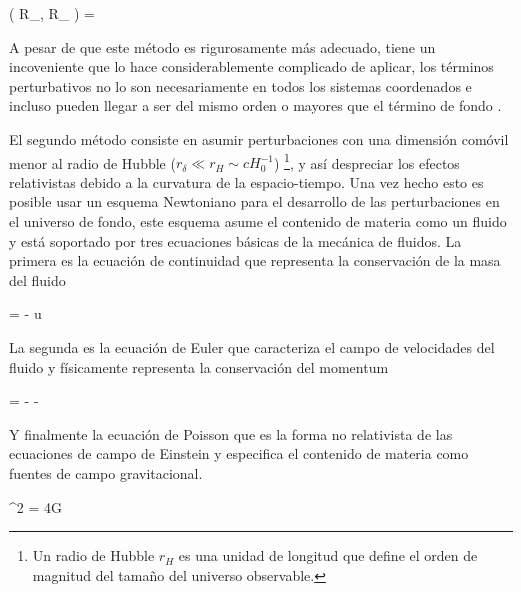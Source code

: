 { ( R_{\mu \nu}, \delta R_{\mu \nu} ) = 
 }


A pesar de que este método es rigurosamente más adecuado, tiene un 
incoveniente que lo hace considerablemente complicado de aplicar, los 
términos perturbativos no lo son necesariamente en todos los sistemas 
coordenados e incluso pueden llegar a ser del mismo orden o mayores que el 
término de fondo \cite{padmanabhan1995}.


El segundo método consiste en asumir perturbaciones con una dimensión 
comóvil menor al radio de Hubble ($r_\delta \ll r_H \sim cH_0^{-1}$) 
\footnote{Un radio de Hubble $r_H$ es una unidad de longitud que define 
el orden de magnitud del tamaño del universo observable.}, y así 
despreciar los efectos relativistas debido a la curvatura de la 
espacio-tiempo. Una vez hecho esto es posible usar un esquema Newtoniano 
para el desarrollo de las perturbaciones en el universo de fondo, este 
esquema asume el contenido de materia como un fluido y está soportado por 
tres ecuaciones básicas de la mecánica de fluidos. La primera es la 
ecuación de continuidad que representa la conservación de la masa del 
fluido


{  = - \rho \nabla \cdot \bds u }


La segunda es la ecuación de Euler que caracteriza el campo de velocidades
del fluido y físicamente representa la conservación del momentum


{  = - - \nabla \varphi }


Y finalmente la ecuación de Poisson que es la forma no relativista de las 
ecuaciones de campo de Einstein y especifica el contenido de materia como
fuentes de campo gravitacional.
	
	
{ \nabla^2 \varphi = 4\pi G \rho }


